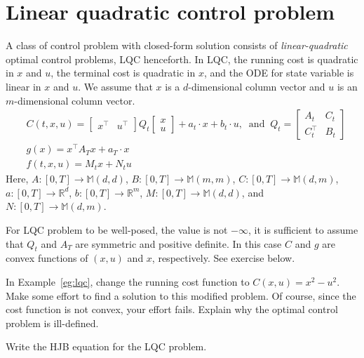 \documentclass[11pt]{book}
\begin{document}
\section{Linear quadratic control problem}
\label{sec:LQC}
A class of control problem with closed-form solution consists of \emph{linear-quadratic} optimal control problems, LQC henceforth. 
In LQC, the running cost is quadratic in $x$ and $u$, the terminal cost is quadratic in $x$, and the ODE for state variable is linear in $x$ and $u$. We assume that $x$ is a $d$-dimensional column vector and $u$ is an $m$-dimensional column vector.
\begin{equation}
    \begin{split}
        &C(t,x,u) = \left[\begin{matrix}
        x^\top&
        u^\top
        \end{matrix}\right]Q_t\left[\begin{matrix}
        x\\
        u
        \end{matrix}\right]+a_t\cdot x + b_t\cdot u,~\text{ and }~Q_t=\left[\begin{matrix}
        A_t&C_t\\
        C_t^\top&B_t
        \end{matrix}\right]\\
        &g(x) = x^\top A_T x+a_T \cdot x\\
        &f(t,x,u) = M_t x + N_t u
    \end{split}
\end{equation}
Here, $A:[0,T]\to \mathbb{M}(d,d)$, $B:[0,T]\to \mathbb{M}(m,m)$, $C:[0,T]\to \mathbb{M}(d,m)$, $a:[0,T]\to \mathbb{R}^d$, $b:[0,T]\to \mathbb{R}^m$, $M:[0,T]\to \mathbb{M}(d,d)$, and $N:[0,T]\to \mathbb{M}(d,m)$. 


For LQC problem to be well-posed, the value is not $-\infty$, it is sufficient to assume that $Q_t$ and $A_T$ are symmetric and positive definite. In this case $C$ and $g$ are convex functions of $(x,u)$ and $x$, respectively. See exercise below.
\begin{ex}
    In Example~\ref{eg:lqc}, change the running cost function to $C(x,u)= x^2 -  u^2$. Make some effort to find a solution to this modified problem. Of course, since the cost function is not convex, your effort fails. Explain why the optimal control problem is ill-defined.
\end{ex}

\begin{ex}
    Write the HJB equation for the LQC problem.
\end{ex}
\end{document}
